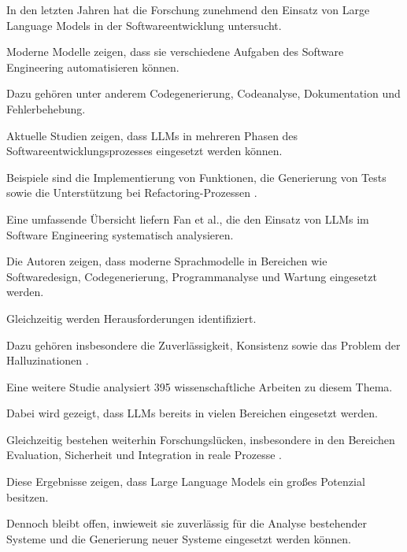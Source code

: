 In den letzten Jahren hat die Forschung zunehmend den
Einsatz von Large Language Models in der
Softwareentwicklung untersucht.

Moderne Modelle zeigen, dass sie verschiedene Aufgaben
des Software Engineering automatisieren können.

Dazu gehören unter anderem Codegenerierung,
Codeanalyse, Dokumentation und Fehlerbehebung.

Aktuelle Studien zeigen, dass LLMs in mehreren Phasen
des Softwareentwicklungsprozesses eingesetzt werden
können.

Beispiele sind die Implementierung von Funktionen, die
Generierung von Tests sowie die Unterstützung bei
Refactoring-Prozessen \cite{LLM4SE}.

Eine umfassende Übersicht liefern Fan et al., die den
Einsatz von LLMs im Software Engineering systematisch
analysieren.

Die Autoren zeigen, dass moderne Sprachmodelle in
Bereichen wie Softwaredesign, Codegenerierung,
Programmanalyse und Wartung eingesetzt werden.

Gleichzeitig werden Herausforderungen identifiziert.

Dazu gehören insbesondere die Zuverlässigkeit,
Konsistenz sowie das Problem der Halluzinationen
\cite{LLM4SE2}.

Eine weitere Studie analysiert 395 wissenschaftliche
Arbeiten zu diesem Thema.

Dabei wird gezeigt, dass LLMs bereits in vielen
Bereichen eingesetzt werden.

Gleichzeitig bestehen weiterhin Forschungslücken,
insbesondere in den Bereichen Evaluation,
Sicherheit und Integration in reale Prozesse
\cite{hou2024largelanguagemodelssoftware}.

Diese Ergebnisse zeigen, dass Large Language Models ein
großes Potenzial besitzen.

Dennoch bleibt offen, inwieweit sie zuverlässig für
die Analyse bestehender Systeme und die Generierung
neuer Systeme eingesetzt werden können.